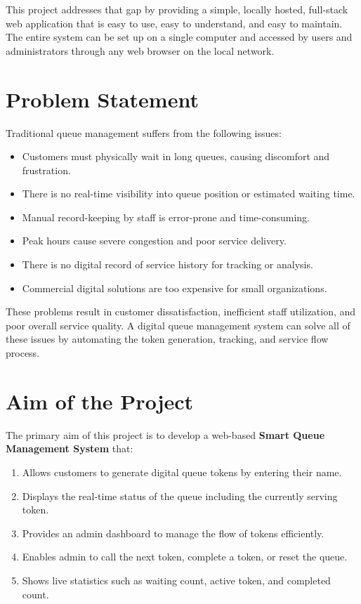 This project addresses that gap by providing a simple, locally hosted, full-stack web application that is easy to use, easy to understand, and easy to maintain. The entire system can be set up on a single computer and accessed by users and administrators through any web browser on the local network.

\section{Problem Statement}

Traditional queue management suffers from the following issues:

\begin{itemize}
    \item Customers must physically wait in long queues, causing discomfort and frustration.
    \item There is no real-time visibility into queue position or estimated waiting time.
    \item Manual record-keeping by staff is error-prone and time-consuming.
    \item Peak hours cause severe congestion and poor service delivery.
    \item There is no digital record of service history for tracking or analysis.
    \item Commercial digital solutions are too expensive for small organizations.
\end{itemize}

These problems result in customer dissatisfaction, inefficient staff utilization, and poor overall service quality. A digital queue management system can solve all of these issues by automating the token generation, tracking, and service flow process.

\section{Aim of the Project}

The primary aim of this project is to develop a web-based \textbf{Smart Queue Management System} that:

\begin{enumerate}
    \item Allows customers to generate digital queue tokens by entering their name.
    \item Displays the real-time status of the queue including the currently serving token.
    \item Provides an admin dashboard to manage the flow of tokens efficiently.
    \item Enables admin to call the next token, complete a token, or reset the queue.
    \item Shows live statistics such as waiting count, active token, and completed count.
\end{enumerate}

